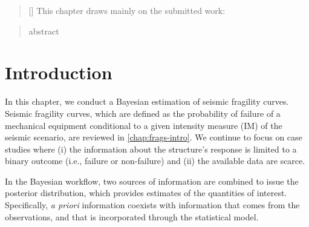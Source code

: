 


\begin{abstract}[\hspace*{-10pt}]
    This chapter draws mainly on the submitted work:   %
\end{abstract}

\begin{abstract}
    abstract
\end{abstract}


\minitoc

\section{Introduction}


In this chapter, we conduct a Bayesian estimation of seismic fragility curves. Seismic fragility curves, which are defined as the probability of failure of a mechanical equipment conditional to a given intensity measure (IM) of the seismic scenario, are reviewed in \cref{chap:frags-intro}. We continue to focus on case studies where (i) the information about the structure's response is limited to a binary outcome (i.e., failure or non-failure) and (ii) the available data are scarce. 

In the Bayesian workflow, two sources of information are combined to issue the posterior distribution, which provides estimates of the quantities of interest. 
Specifically, \emph{a priori} information  coexists with information that comes from the observations, and that is incorporated through the statistical model.

